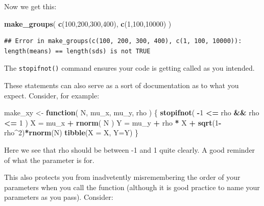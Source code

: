 \documentclass[
]{book}
\newenvironment{Shaded}{\begin{snugshade}}{\end{snugshade}}
\newcommand{\AttributeTok}[1]{\textcolor[rgb]{0.13,0.29,0.53}{#1}}
\newcommand{\ControlFlowTok}[1]{\textcolor[rgb]{0.13,0.29,0.53}{\textbf{#1}}}
\newcommand{\DecValTok}[1]{\textcolor[rgb]{0.00,0.00,0.81}{#1}}
\newcommand{\FunctionTok}[1]{\textcolor[rgb]{0.13,0.29,0.53}{\textbf{#1}}}
\newcommand{\NormalTok}[1]{#1}
\newcommand{\OtherTok}[1]{\textcolor[rgb]{0.56,0.35,0.01}{#1}}
\newcommand{\SpecialCharTok}[1]{\textcolor[rgb]{0.81,0.36,0.00}{\textbf{#1}}}
\begin{document}
Now we get this:

\begin{Shaded}
\begin{Highlighting}[]
\FunctionTok{make\_groups}\NormalTok{( }\FunctionTok{c}\NormalTok{(}\DecValTok{100}\NormalTok{,}\DecValTok{200}\NormalTok{,}\DecValTok{300}\NormalTok{,}\DecValTok{400}\NormalTok{), }
             \FunctionTok{c}\NormalTok{(}\DecValTok{1}\NormalTok{,}\DecValTok{100}\NormalTok{,}\DecValTok{10000}\NormalTok{) )}
\end{Highlighting}
\end{Shaded}

\begin{verbatim}
## Error in make_groups(c(100, 200, 300, 400), c(1, 100, 10000)): length(means) == length(sds) is not TRUE
\end{verbatim}

The \texttt{stopifnot()} command ensures your code is getting called as you intended.

These statements can also serve as a sort of documentation as to what you expect.
Consider, for example:

\begin{Shaded}
\begin{Highlighting}[]
\NormalTok{make\_xy }\OtherTok{\textless{}{-}} \ControlFlowTok{function}\NormalTok{( N, mu\_x, mu\_y, rho ) \{}
  \FunctionTok{stopifnot}\NormalTok{( }\SpecialCharTok{{-}}\DecValTok{1} \SpecialCharTok{\textless{}=}\NormalTok{ rho }\SpecialCharTok{\&\&}\NormalTok{ rho }\SpecialCharTok{\textless{}=} \DecValTok{1}\NormalTok{ )}
\NormalTok{  X }\OtherTok{=}\NormalTok{ mu\_x }\SpecialCharTok{+} \FunctionTok{rnorm}\NormalTok{( N )}
\NormalTok{  Y }\OtherTok{=}\NormalTok{ mu\_y }\SpecialCharTok{+}\NormalTok{ rho }\SpecialCharTok{*}\NormalTok{ X }\SpecialCharTok{+} \FunctionTok{sqrt}\NormalTok{(}\DecValTok{1}\SpecialCharTok{{-}}\NormalTok{rho}\SpecialCharTok{\^{}}\DecValTok{2}\NormalTok{)}\SpecialCharTok{*}\FunctionTok{rnorm}\NormalTok{(N)}
  \FunctionTok{tibble}\NormalTok{(}\AttributeTok{X =}\NormalTok{ X, }\AttributeTok{Y=}\NormalTok{Y)}
\NormalTok{\}}
\end{Highlighting}
\end{Shaded}

Here we see that rho should be between -1 and 1 quite clearly.
A good reminder of what the parameter is for.

This also protects you from inadvetently misremembering the order of your parameters when you call the function (although it is good practice to name your parameters as you pass).
Consider:
\end{document}
